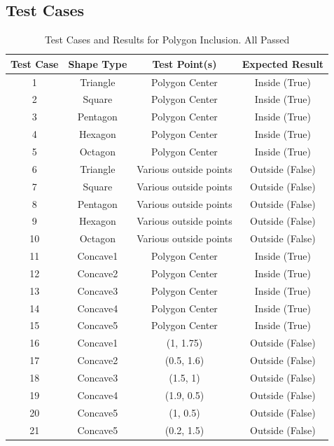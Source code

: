 \documentclass{labReport}
\begin{document}
\begin{multicols*}{2}
\section{Test Cases}
\begin{table}[h!]
\centering
\begin{tabular}{|c|c|c|c|}
\hline
\textbf{Test Case} & \textbf{Shape Type} & \textbf{Test Point(s)} & \textbf{Expected Result} \\ \hline
1 & Triangle      & Polygon Center  & Inside (True) \\ \hline
2 & Square        & Polygon Center      & Inside (True) \\ \hline
3 & Pentagon      & Polygon Center      & Inside (True) \\ \hline
4 & Hexagon       & Polygon Center      & Inside (True) \\ \hline
5 & Octagon       & Polygon Center      & Inside (True) \\ \hline
6 & Triangle      & Various outside points & Outside (False) \\ \hline
7 & Square        & Various outside points & Outside (False) \\ \hline
8 & Pentagon      & Various outside points & Outside (False) \\ \hline
9 & Hexagon       & Various outside points & Outside (False) \\ \hline
10 & Octagon      & Various outside points & Outside (False) \\ \hline
11 & Concave1     & Polygon Center          & Inside (True) \\ \hline
12 & Concave2     & Polygon Center          & Inside (True) \\ \hline
13 & Concave3     & Polygon Center        & Inside (True) \\ \hline
14 & Concave4     & Polygon Center          & Inside (True) \\ \hline
15 & Concave5     & Polygon Center          & Inside (True) \\ \hline
16 & Concave1     & (1, 1.75)       & Outside (False) \\ \hline
17 & Concave2     & (0.5, 1.6)      & Outside (False) \\ \hline
18 & Concave3     & (1.5, 1)        & Outside (False) \\ \hline
19 & Concave4     & (1.9, 0.5)      & Outside (False) \\ \hline
20 & Concave5     & (1, 0.5)        & Outside (False) \\ \hline
21 & Concave5     & (0.2, 1.5)      & Outside (False) \\ \hline
\end{tabular}
\caption{Test Cases and Results for Polygon Inclusion. All Passed}
\label{tab:test_cases}
\end{table}
    



\end{multicols*}
\end{document}
